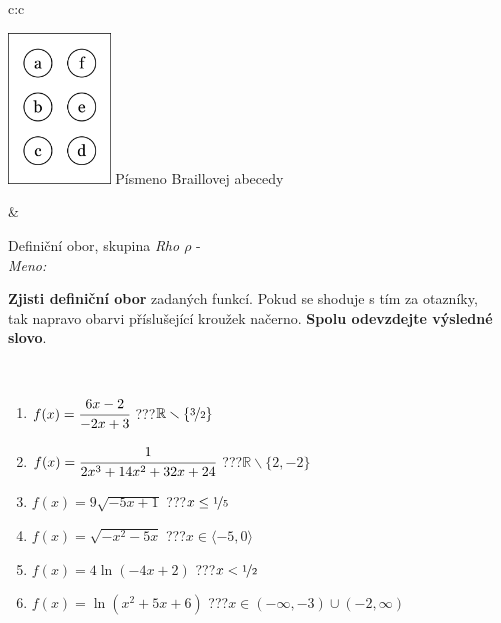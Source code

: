 \documentclass[10pt]{report}
\begin{document}
\begin{tabular}{c:c}
\begin{minipage}[c][104.5mm][t]{0.5\linewidth}
\begin{center}
\begin{minipage}{0.20\linewidth}
\begin{center}
\includegraphics[height=40mm]{../images/braille.png}
{\small Písmeno Braillovej abecedy}
\end{center}
\end{minipage}
\end{center}
\end{minipage}
&
\begin{minipage}[c][104.5mm][t]{0.5\linewidth}
\begin{center}
\vspace{7mm}
{\huge Definiční obor, skupina \textit{Rho $\rho$} -}\\[5mm]
\textit{Meno:}\phantom{xxxxxxxxxxxxxxxxxxxxxxxxxxxxxxxxxxxxxxxxxxxxxxxxxxxxxxxxxxxxxxxxx}\\[5mm]
\begin{minipage}{0.95\linewidth}
\textbf{Zjisti definiční obor} zadaných funkcí. Pokud se shoduje s tím za otazníky,\\tak napravo obarvi příslušející kroužek načerno. \textbf{Spolu odevzdejte výsledné slovo}.
\end{minipage}
\\[1mm]
\begin{minipage}{0.79\linewidth}
\begin{center}
\begin{varwidth}{\linewidth}
\begin{enumerate}
\normalsizerrr
\item $f(x)=\cfrac{6x-2}{-2x+3}$\quad \dotfill\; ???\;\dotfill \quad $\mathbb{R}\smallsetminus\{\nicefrac{3}{2}\}$
\item $f(x)=\cfrac{1}{2x^3+14x^2+32x+24}$\quad \dotfill\; ???\;\dotfill \quad $\mathbb{R}\smallsetminus\{2,-2\}$
\item $f(x)=9\sqrt{-5x+1}$\quad \dotfill\; ???\;\dotfill \quad $x\leq\nicefrac{1}{5}$
\item $f(x)=\sqrt{-x^2-5x}$\quad \dotfill\; ???\;\dotfill \quad $x\in\langle-5 , 0\rangle$
\item $f(x)=4\ln{(-4x+2)}$\quad \dotfill\; ???\;\dotfill \quad $x<\nicefrac{1}{2}$
\item $f(x)=\ln{(x^2+5x+6)}$\quad \dotfill\; ???\;\dotfill \quad $x\in(-\infty , -3)\cup(-2 , \infty)$

\end{enumerate}
\end{varwidth}
\end{center}
\end{minipage}
\end{center}
\end{minipage}
\end{tabular}
\end{document}
